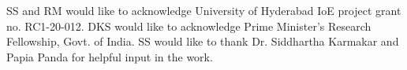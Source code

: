 \documentclass[aps, a4paper,superscriptaddress,12pt,preprintnumbers,floatfix,nofootinbib,amsmath,amssymb]{revtex4}
\begin{document}
\acknowledgments 
SS and RM would like to acknowledge University of Hyderabad IoE project grant no. RC1-20-012.  DKS would like to acknowledge Prime Minister's Research Fellowship, Govt. of India. SS would like to thank Dr. Siddhartha Karmakar and Papia Panda for helpful input in the work.




% 

\end{document}
